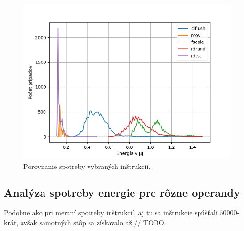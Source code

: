 \begin{figure}\label{img:instruction_comparison}
  \centering
  \includegraphics[scale=0.7]{./obrazky-figures/instr_comparison.png}
  \caption{Porovnanie spotreby vybraných inštrukcií.}
\end{figure}

\subsection{Analýza spotreby energie pre rôzne operandy}
Podobne ako pri meraní spotreby inštrukcií, aj tu sa inštrukcie spúšťali $50000$-krát, avšak samotných stôp sa získavalo až // TODO.



